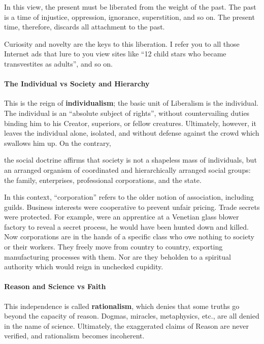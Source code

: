 In this view, the present must be liberated from the weight of the past. The past is a time of injustice, oppression, ignorance, superstition, and so on. The present time, therefore, discards all attachment to the past.

Curiosity and novelty are the keys to this liberation. I refer you to all those Internet ads that lure to you view sites like ``12 child stars who became transvestites as adults'', and so on.

\paragraph{The Individual vs Society and Hierarchy}


This is the reign of \textbf{individualism}; the basic unit of Liberalism is the individual. The individual is an ``absolute subject of rights'', without countervailing duties binding him to his Creator, superiors, or fellow creatures. Ultimately, however, it leaves the individual alone, isolated, and without defense against the crowd which swallows him up. On the contrary,

\begin{quotex}
the social doctrine affirms that society is not a shapeless mass of individuals, but an arranged organism of coordinated and hierarchically arranged social groups: the family, enterprises, professional corporations, and the state.
\end{quotex}


In this context, ``corporation'' refers to the older notion of association, including guilds. Business interests were cooperative to prevent unfair pricing. Trade secrets were protected. For example, were an apprentice at a Venetian glass blower factory to reveal a secret process, he would have been hunted down and killed. Now corporations are in the hands of a specific class who owe nothing to society or their workers. They freely move from country to country, exporting manufacturing processes with them. Nor are they beholden to a spiritual authority which would reign in unchecked cupidity.

\paragraph{Reason and Science vs Faith}


This independence is called \textbf{rationalism}, which denies that some truths go beyond the capacity of reason. Dogmas, miracles, metaphysics, etc., are all denied in the name of science. Ultimately, the exaggerated claims of Reason are never verified, and rationalism becomes incoherent.

